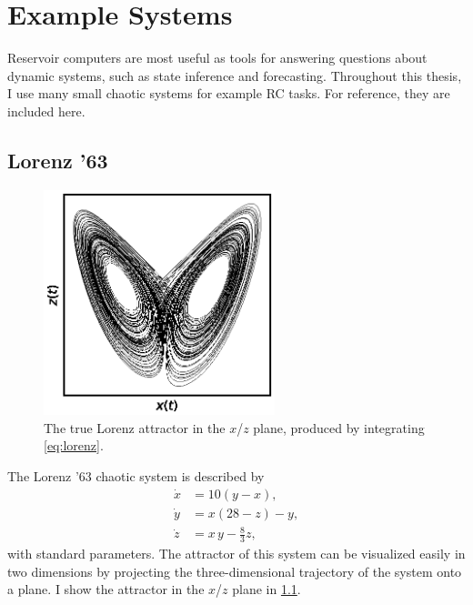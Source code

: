 \chapter{Example Systems}\label{ch:systems}

Reservoir computers are most useful as tools for answering questions
about dynamic systems, such as state inference and
forecasting. Throughout this thesis, I use many small chaotic systems
for example RC tasks. For reference, they are included here.

\section{Lorenz '63}\label{sec:lorenz}

\begin{figure}
  \includegraphics[width=0.6\textwidth]{figures/lorenz}
  \caption{The true Lorenz attractor in the $x$/$z$ plane, produced by integrating \cref{eq:lorenz}.}%
  \label{fig:lorenz}
\end{figure}

The Lorenz '63 chaotic system is described by
\begin{equation}
  \begin{aligned}
    \dot{x} &= 10 \left(y - x\right), \\
    \dot{y} &= x \left(28 - z\right) - y, \\
    \dot{z} &= x\,y - \frac{8}{3} z,
  \end{aligned}
  \label{eq:lorenz}
\end{equation}
with standard parameters.\cite{lorenz1963} The attractor of this
system can be visualized easily in two dimensions by projecting the
three-dimensional trajectory of the system onto a plane. I show the
attractor in the $x$/$z$ plane in \cref{fig:lorenz}.

